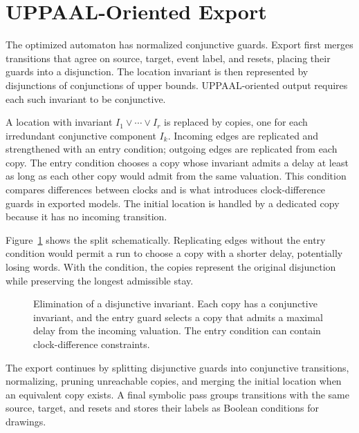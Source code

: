 \documentclass{ieeeaccess}
\begin{document}
\section{UPPAAL-Oriented Export}
\label{sec:export}
The optimized automaton has normalized conjunctive guards. Export first merges transitions that agree on source, target, event label, and resets, placing their guards into a disjunction. The location invariant is then represented by disjunctions of conjunctions of upper bounds. UPPAAL-oriented output requires each such invariant to be conjunctive.

A location with invariant $I_1\lor\cdots\lor I_r$ is replaced by copies, one for each irredundant conjunctive component $I_k$. Incoming edges are replicated and strengthened with an entry condition; outgoing edges are replicated from each copy. The entry condition chooses a copy whose invariant admits a delay at least as long as each other copy would admit from the same valuation. This condition compares differences between clocks and is what introduces clock-difference guards in exported models. The initial location is handled by a dedicated copy because it has no incoming transition.

Figure~\ref{fig:disj-general} shows the split schematically. Replicating edges without the entry condition would permit a run to choose a copy with a shorter delay, potentially losing words. With the condition, the copies represent the original disjunction while preserving the longest admissible stay.

\begin{figure}[t]
\centering
\resizebox{\textwidth}{!}{}
\caption{Elimination of a disjunctive invariant. Each copy has a conjunctive invariant, and the entry guard selects a copy that admits a maximal delay from the incoming valuation. The entry condition can contain clock-difference constraints.}
\label{fig:disj-general}
\end{figure}

The export continues by splitting disjunctive guards into conjunctive transitions, normalizing, pruning unreachable copies, and merging the initial location when an equivalent copy exists. A final symbolic pass groups transitions with the same source, target, and resets and stores their labels as Boolean conditions for drawings.
\end{document}
